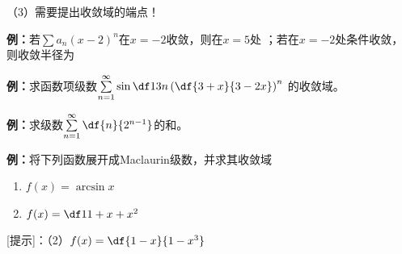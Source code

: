 （3）需要提出收敛域的端点！

{\bf 例：}若$\sum a_n(x-2)^n$在$x=-2$收敛，则在$x=5$处
\underline{\;}；若在$x=-2$处条件收敛，
则收敛半径为\underline{\;}

{\bf 例：}求函数项级数$\sum\limits_{n=1}^{\infty}
\sin\df 1 {3n}\left(\df{3+x}{3-2x}\right)^n$
的收敛域。

{\bf 例：}求级数$\sum\limits_{n=1}^{\infty}\df{n}{2^{n-1}}$的和。

{\bf 例：}将下列函数展开成Maclaurin级数，并求其收敛域
\begin{enumerate}[(1)]
  \setlength{\itemindent}{1cm}
  \item $f(x)=\arcsin x$
  \item $f(x)=\df 1{1+x+x^2}$
\end{enumerate}

[提示]：（2）$f(x)=\df{1-x}{1-x^3}$

